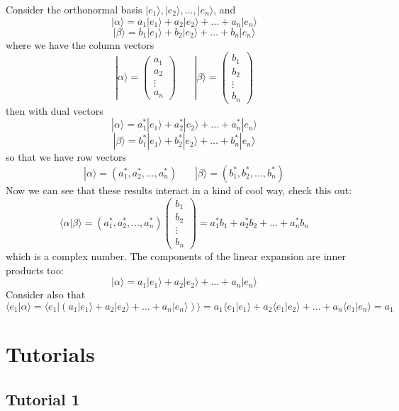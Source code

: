 \documentclass[english, 11pt]{article}
\newcommand{\ket}[1]{| #1 \rangle}
\newcommand{\braket}[2]{\langle #1 | #2 \rangle}
\newcommand{\ka}{| \alpha \rangle}
\newcommand{\kb}{| \beta \rangle}
\newcommand{\mtx}[1]{\left(\begin{matrix}#1\end{matrix}\right)}
\newcommand{\ebasis}{\ket{e_1}, \ket{e_2}, \ldots, \ket{e_n}}
\begin{document}
        Consider the orthonormal basis $\ebasis$, and
        \[ \ka = a_1 \ket{e_1} + a_2 \ket{e_2} + \ldots + a_n \ket{e_n} \]
        \[ \kb = b_1 \ket{e_1} + b_2 \ket{e_2} + \ldots + b_n \ket{e_n} \]
        where we have the column vectors
        \[ \ka = \mtx{a_1 \\ a_2 \\ \vdots \\ a_n} \ \ \ \ \ \ \ \ \kb = \mtx{b_1 \\ b_2 \\ \vdots \\ b_n} \]
        then with dual vectors
        \[ \ka  = a_1^*\ket{e_1} + a_2^*\ket{e_2} + \ldots + a_n^*\ket{e_n} \]
        \[ \kb  = b_1^*\ket{e_1} + b_2^*\ket{e_2} + \ldots + b_n^*\ket{e_n} \]
        so that we have row vectors
        \[ \ka = (a_1^*, a_2^*, \ldots, a_n^*)  \ \ \ \ \ \ \ \ \kb = (b_1^*, b_2^*, \ldots,b_n^*) \]
        Now we can see that these results interact in a kind of cool way, check this out:
        \[ \braket{\alpha}{\beta} = (a_1^*, a_2^*, \ldots, a_n^*) \mtx{b_1 \\ b_2 \\ \vdots \\ b_n} = a_1^*b_1 + a_2^*b_2 + \ldots + a_n^* b_n \]
        which is a complex number. The components of the linear expansion are inner products too:
        \[ \ka = a_1\ket{e_1} + a_2\ket{e_2} + \ldots + a_n\ket{e_n} \]
        Consider also that
        \[ \braket{e_1}{\alpha} = \braket{e_1}{\left(a_1\ket{e_1} + a_2\ket{e_2} + \ldots + a_n\ket{e_n}\right)} = a_1\braket{e_1}{e_1} + a_2\braket{e_1}{e_2} + \ldots + a_n\braket{e_1}{e_n} = a_1\]


   \section{Tutorials}

     \subsection{Tutorial 1}
\end{document}
